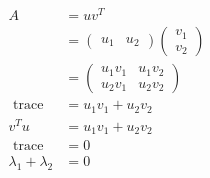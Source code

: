 \documentclass[main.tex]{subfiles}
\begin{document}
\begin{enumerate}
    $$
    \begin{aligned}
    A&=u v^{T} \\
    &=\left(\begin{array}{ll}
    u_{1} & u_{2}
    \end{array}\right)\left(\begin{array}{l}
    v_{1} \\
    v_{2}
    \end{array}\right) \\
    &=\left(\begin{array}{ll}
    u_{1} v_{1} & u_{1} v_{2} \\
    u_{2} v_{1} & u_{2} v_{2}
    \end{array}\right)\\
    \text{ trace }&=u_{1} v_{1}+u_{2} v_{2}\\
     v^{T} u &= u_{1} v_{1}+u_{2} v_{2}\\
    \text{ trace }&=0\\
    \lambda_{1}+\lambda_{2}&=0
    \end{aligned}
    $$
    
\end{enumerate}
\end{document}
